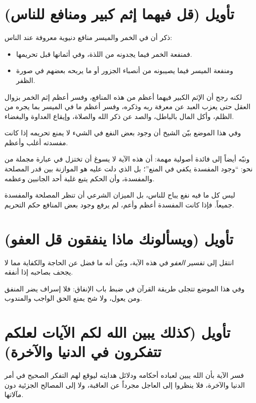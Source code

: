 \section{تأويل (قل فيهما إثم كبير ومنافع للناس)}
ذكر  أن في الخمر والميسر منافع دنيوية معروفة عند الناس:
\begin{itemize}
    \item فمنفعة الخمر فيما يجدونه من اللذة، وفي أثمانها قبل تحريمها.
    \item ومنفعة الميسر فيما يصيبونه من أنصباء الجزور أو ما يربحه بعضهم في صورة الظفر.
\end{itemize}

لكنه رجح أن الإثم الكبير فيهما أعظم من هذه المنافع، وفسر أعظم إثم الخمر بزوال العقل حتى يعزب العبد عن معرفة ربه وذكره، وفسر أعظم ما في الميسر بما يجره من الظلم، وأكل المال بالباطل، والصد عن ذكر الله والصلاة، وإيقاع العداوة والبغضاء.

وفي هذا الموضع بيّن الشيخ أن وجود بعض النفع في الشيء لا يمنع تحريمه إذا كانت مفسدته أغلب وأعظم.

ونبّه أيضاً إلى فائدة أصولية مهمة: أن هذه الآية لا يسوغ أن تختزل في عبارة مجملة من نحو: ``وجود المفسدة يكفي في المنع''؛ بل الذي دلت عليه هو الموازنة بين قدر المصلحة والمفسدة، وأن الحكم يتبع غلبة أحد الجانبين وعظمه.

\begin{fawaid}
ليس كل ما فيه نفع يباح للناس، بل الميزان الشرعي أن تنظر المصلحة والمفسدة جميعاً. فإذا كانت المفسدة أعظم وأعم، لم يرفع وجود بعض المنافع حكم التحريم.
\end{fawaid}

\separator

\section{تأويل (ويسألونك ماذا ينفقون قل العفو)}
انتقل  إلى تفسير \textit{العفو} في هذه الآية، وبيّن أنه ما فضل عن الحاجة والكفاية مما لا يجحف بصاحبه إذا أنفقه.

وفي هذا الموضع تتجلى طريقة القرآن في ضبط باب الإنفاق: فلا إسراف يضر المنفق ومن يعول، ولا شح يمنع الحق الواجب والمندوب.

\section{تأويل (كذلك يبين الله لكم الآيات لعلكم تتفكرون في الدنيا والآخرة)}
فسر  الآية بأن الله يبين لعباده أحكامه ودلائل هدايته ليوقع لهم التفكر الصحيح في أمر الدنيا والآخرة، فلا ينظروا إلى العاجل مجرداً عن العاقبة، ولا إلى المصالح الجزئية دون مآلاتها.

